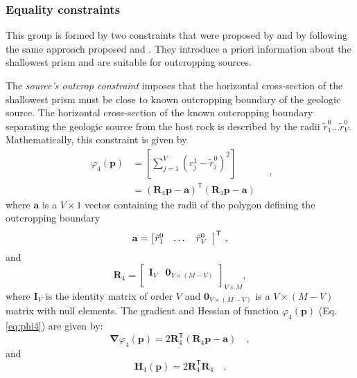\subsubsection{Equality constraints}


This group is formed by two constraints that were proposed by \cite{oliveirajr-etal2011} and \cite{oliveirajr-barbosa2013} by following the same approach proposed \cite{barbosa-etal1997} and \cite{barbosa-1999a}. 
They introduce a priori information about the shallowest prism and are suitable for outcropping sources.

The \textit{source’s outcrop constraint} imposes that the horizontal cross-section of the shallowest prism must be close to known outcropping boundary of the geologic source.
The horizontal cross-section of the known outcropping boundary separating the geologic source from the host rock is described by the radii $\tilde{r}_{1}^{0} \dots \tilde{r}_{V}^{0}$. Mathematically, this constraint is given by
\begin{equation}\label{eq:phi4}
\begin{split}
\varphi_{4}(\mathbf{p}) &= \left[ \sum\limits^{V}_{j=1}\left(r^{1}_{j}-\tilde{r}^{0}_{j}\right)^2\right] \\
&= \left(\mathbf{R}_{4} \mathbf{p} - \mathbf{a} \right)^{\mathsf{T}} 
\left(\mathbf{R}_{4} \mathbf{p} - \mathbf{a} \right)
\end{split} \quad ,
\end{equation}
where $\mathbf{a}$ is a $V \times 1$ vector containing the radii of the polygon defining the outcropping boundary
\begin{equation}
\mathbf{a} = \left[ \begin{array}{@{}*{12}{c}@{}}
\tilde{r}_{1}^{0} & \dots & \tilde{r}_{V}^{0} \\
\end{array} \right]^{\mathsf{T}} \: ,
\label{eq:a-vector}
\end{equation}
and
\begin{equation}
\mathbf{R}_{4} = 
\begin{bmatrix}
\mathbf{I}_{V} & \mathbf{0}_{V \times (M-V)} \\
\end{bmatrix}_{V\times M},
\label{eq:R4-matrix}
\end{equation}
where $\mathbf{I}_{V}$ is the identity matrix of order $V$ and 
$\mathbf{0}_{V \times (M-V)}$ is a $V \times (M-V)$ matrix with null elements.
The gradient and Hessian of function $\varphi_{4}(\mathbf{p})$ (Eq. \ref{eq:phi4}) are given by:
\begin{equation}\label{eq:phi4_grad}
\boldsymbol{\nabla}\varphi_{4}(\mathbf{p}) = 2 \mathbf{R}_{4}^{\mathsf{T}} 
\left(\mathbf{R}_{4} \mathbf{p} - \mathbf{a} \right) \quad ,
\end{equation}
and
\begin{equation}\label{eq:phi4_hessian}
\mathbf{H}_{4}(\mathbf{p}) = 2 \mathbf{R}^{\mathsf{T}}_{4}\mathbf{R}_{4} \quad .
\end{equation}

